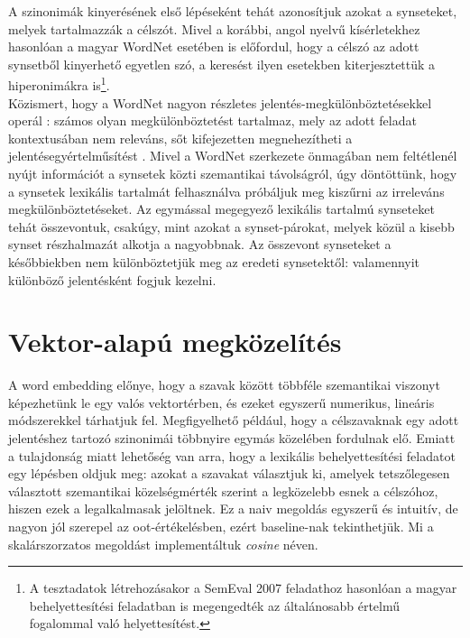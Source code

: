 \documentclass{llncs}
\begin{document}
A szinonim\'{a}k kinyer\'{e}s\'{e}nek els\H{o} l\'{e}p\'{e}sek\'{e}nt teh\'{a}t azonos\'{i}tjuk azokat a synseteket, melyek tartalmazz\'{a}k a c\'{e}lsz\'{o}t. Mivel a kor\'{a}bbi, angol nyelv\H{u} k\'{i}s\'{e}rletekhez hasonl\'{o}an \cite{UNTSemeval} a magyar WordNet eset\'{e}ben is el\H{o}fordul, hogy a c\'{e}lsz\'{o} az adott synsetb\H{o}l kinyerhet\H{o} egyetlen sz\'{o}, a keres\'{e}st ilyen esetekben kiterjesztett\"{u}k a hiperonim\'{a}kra is\footnote{A tesztadatok l\'{e}trehoz\'{a}sakor a SemEval 2007 feladathoz hasonl\'{o}an a magyar behelyettes\'{i}t\'{e}si feladatban is megengedt\'{e}k az \'{a}ltal\'{a}nosabb \'{e}rtelm\H{u} fogalommal val\'{o} helyettes\'{i}t\'{e}st.}.\\

K\"{o}zismert, hogy a WordNet nagyon r\'{e}szletes jelent\'{e}s-megk\"{u}l\"{o}nb\"{o}ztet\'{e}sekkel oper\'{a}l \cite{idewilks06}: sz\'{a}mos olyan megk\"{u}l\"{o}nb\"{o}ztet\'{e}st tartalmaz, mely az adott feladat kontextus\'{a}ban nem relev\'{a}ns, s\H{o}t kifejezetten megnehez\'{i}theti a jelent\'{e}segy\'{e}rtelm\H{u}s\'{i}t\'{e}st \cite{veronis03}. Mivel a WordNet szerkezete \"{o}nmag\'{a}ban nem felt\'{e}tlen\'{e}l ny\'{u}jt inform\'{a}ci\'{o}t a synsetek k\"{o}zti szemantikai t\'{a}vols\'{a}gr\'{o}l, \'{u}gy d\"{o}nt\"{o}tt\"{u}nk, hogy a synsetek lexik\'{a}lis tartalm\'{a}t felhaszn\'{a}lva pr\'{o}b\'{a}ljuk meg kisz\H{u}rni az irrelev\'{a}ns megk\"{u}l\"{o}nb\"{o}ztet\'{e}seket. Az egym\'{a}ssal megegyez\H{o} lexik\'{a}lis tartalm\'{u} synseteket teh\'{a}t \"{o}sszevontuk, csak\'{u}gy, mint azokat a synset-p\'{a}rokat, melyek k\"{o}z\"{u}l a kisebb synset r\'{e}szhalmaz\'{a}t alkotja a nagyobbnak. Az \"{o}sszevont synseteket a k\'{e}s\H{o}bbiekben nem k\"{u}l\"{o}nb\"{o}ztetj\"{u}k meg az eredeti synsetekt\H{o}l: valamennyit k\"{u}l\"{o}nb\"{o}z\H{o} jelent\'{e}sk\'{e}nt fogjuk kezelni.\\
 

\section{Vektor-alap\'{u} megk\"{o}zel\'{i}t\'{e}s}

A word embedding el\H{o}nye, hogy a szavak k\"{o}z\"{o}tt t\"{o}bbf\'{e}le szemantikai viszonyt k\'{e}pezhet\"{u}nk le egy val\'{o}s vektort\'{e}rben, \'{e}s ezeket egyszer\H{u} numerikus, line\'{a}ris m\'{o}dszerekkel t\'{a}rhatjuk fel. Megfigyelhet\H{o} p\'{e}ld\'{a}ul, hogy a c\'{e}lszavaknak egy adott jelent\'{e}shez tartoz\'{o} szinonim\'{a}i t\"{o}bbnyire egym\'{a}s k\"{o}zel\'{e}ben fordulnak el\H{o}. Emiatt a tulajdons\'{a}g miatt lehet\H{o}s\'{e}g van arra, hogy a lexik\'{a}lis behelyettes\'{i}t\'{e}si feladatot egy l\'{e}p\'{e}sben oldjuk meg: azokat a szavakat v\'{a}lasztjuk ki, amelyek tetsz\H{o}legesen v\'{a}lasztott szemantikai k\"{o}zels\'{e}gm\'{e}rt\'{e}k szerint a legk\"{o}zelebb esnek a c\'{e}lsz\'{o}hoz, hiszen ezek a legalkalmasak jel\"{o}ltnek. Ez a naiv megold\'{a}s egyszer\H{u} \'{e}s intuit\'{i}v, de nagyon j\'{o}l szerepel az oot-\'{e}rt\'{e}kel\'{e}sben, ez\'{e}rt baseline-nak tekinthetj\"{u}k. Mi a skal\'{a}rszorzatos megold\'{a}st implement\'{a}ltuk \emph{cosine} n\'{e}ven.\\
\end{document}
